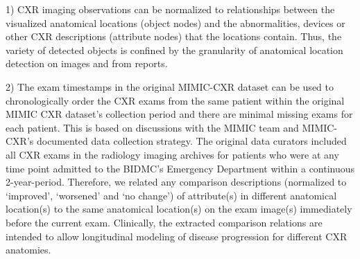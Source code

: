 1) CXR imaging observations can be normalized to relationships between the visualized anatomical locations (object nodes) and the abnormalities, devices or other CXR descriptions (attribute nodes) that the locations contain. Thus, the variety of detected objects is confined by the granularity of anatomical location detection on images and from reports. 

 2) The exam timestamps in the original MIMIC-CXR dataset can be used to chronologically order the CXR exams from the same patient within the original MIMIC CXR dataset's collection period and there are minimal missing exams for each patient. This is based on discussions with the MIMIC team and MIMIC-CXR's documented data collection strategy. The original data curators included all CXR exams in the radiology imaging archives for patients who were at any time point admitted to the BIDMC's Emergency Department within a continuous 2-year-period. Therefore, we related any comparison descriptions (normalized to `improved', `worsened' and `no change') of attribute(s) in different anatomical location(s) to the same anatomical location(s) on the exam image(s) immediately before the current exam. Clinically, the extracted comparison relations are intended to allow longitudinal modeling of disease progression for different CXR anatomies.


% 




